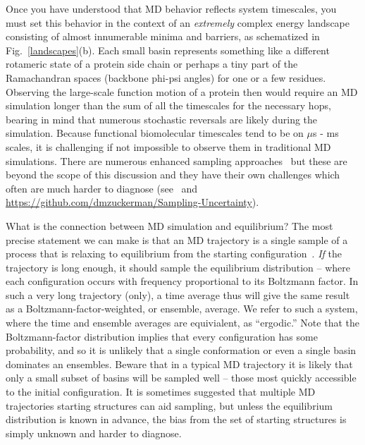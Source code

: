 \documentclass[9pt,bestpractices]{livecoms}
\begin{document}
Once you have understood that MD behavior reflects system timescales, you must set this behavior in the context of an \emph{extremely} complex energy landscape consisting of almost innumerable minima and barriers, as schematized in Fig.\ \ref{landscapes}(b).  
Each small basin represents something like a different rotameric state of a protein side chain or perhaps a tiny part of the Ramachandran spaces (backbone phi-psi angles) for one or a few residues.  
Observing the large-scale function motion of a protein then would require an MD simulation longer than the sum of all the timescales for the necessary hops, bearing in mind that numerous stochastic reversals are likely during the simulation.  
Because functional biomolecular timescales tend to be on $\mu$s - ms scales, it is challenging if not impossible to observe them in traditional MD simulations.  
There are numerous enhanced sampling approaches~\cite{Zuckerman:2011:AnnuRevBiophys, Chong:2017:CurrentOpinioninStructuralBiology} but these are beyond the scope of this discussion and they have their own challenges which often are much harder to diagnose (see~\cite{Grossfield:2009:AnnuRepComputChem} and  \url{https://github.com/dmzuckerman/Sampling-Uncertainty}).

What is the connection between MD simulation and equilibrium?  The most precise statement we can make is that an MD trajectory is a single sample of a process that is relaxing to equilibrium from the starting configuration~\cite{Zuckerman:2015:StatisticalBiophysicsBlog, Zuckerman:2010:}.  
\emph{If} the trajectory is long enough, it should sample the equilibrium distribution -- where each configuration occurs with frequency proportional to its Boltzmann factor.  
In such a very long trajectory (only), a time average thus will give the same result as a Boltzmann-factor-weighted, or ensemble, average.  
We refer to such a system, where the time and ensemble averages are equivialent, as ``ergodic.''
Note that the Boltzmann-factor distribution implies that every configuration has some probability, and so it is unlikely that a single conformation or even a single basin dominates an ensembles. 
Beware that in a typical MD trajectory it is likely that only a small subset of basins will be sampled well -- those most quickly accessible to the initial configuration.  
It is sometimes suggested that multiple MD trajectories starting structures can aid sampling, but unless the equilibrium distribution is known in advance, the bias from the set of starting structures is simply unknown and harder to diagnose.
\end{document}
